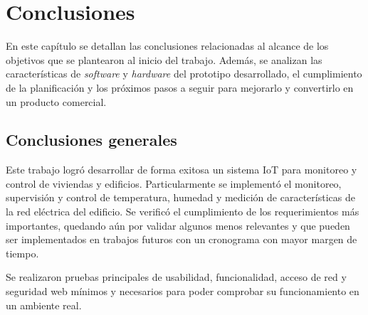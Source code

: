 
\chapter{Conclusiones} %

\label{Chapter5} %

En este capítulo se detallan las conclusiones relacionadas al alcance de los objetivos que se plantearon al inicio del trabajo. Además, se analizan las características de \emph{software} y \emph{hardware} del prototipo desarrollado, el cumplimiento de la planificación y los próximos pasos a seguir para mejorarlo y convertirlo en un producto comercial.




\section{Conclusiones generales }

Este trabajo logró desarrollar de forma exitosa un sistema IoT para monitoreo y control de viviendas y edificios. Particularmente se implementó el monitoreo, supervisión y control de temperatura, humedad y medición de características de la red eléctrica del edificio. Se verificó el cumplimiento de los requerimientos más importantes, quedando aún por validar algunos menos relevantes y que pueden ser implementados en trabajos futuros con un cronograma con mayor margen de tiempo.





Se realizaron pruebas principales de usabilidad, funcionalidad, acceso de red y seguridad web mínimos y necesarios para poder comprobar su funcionamiento en un ambiente real. 


